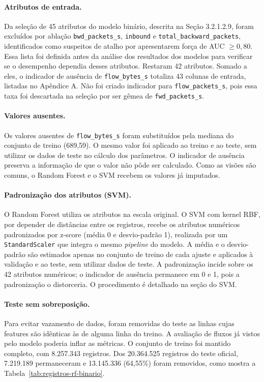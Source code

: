 \documentclass[
    12pt,                %
    openright,           %
    oneside,             %
    a4paper,             %
    english,             %
    brazil               %
]{abntex2}
\begin{document}
\paragraph{Atributos de entrada.}
Da seleção de 45 atributos do modelo binário, descrita na Seção 3.2.1.2.9, foram excluídos por ablação \texttt{bwd\_packets\_s}, \texttt{inbound} e \texttt{total\_backward\_packets}, identificados como suspeitos de atalho por apresentarem força de AUC $\geq 0{,}80$. Essa lista foi definida antes da análise dos resultados dos modelos para verificar se o desempenho dependia desses atributos. Restaram 42 atributos. Somado a eles, o indicador de ausência de \texttt{flow\_bytes\_s} totaliza 43 colunas de entrada, listadas no Apêndice A. Não foi criado indicador para \texttt{flow\_packets\_s}, pois essa taxa foi descartada na seleção por ser gêmea de \texttt{fwd\_packets\_s}.

\paragraph{Valores ausentes.}
Os valores ausentes de \texttt{flow\_bytes\_s} foram substituídos pela mediana do conjunto de treino (689,59). O mesmo valor foi aplicado ao treino e ao teste, sem utilizar os dados de teste no cálculo dos parâmetros. O indicador de ausência preserva a informação de que o valor não pôde ser calculado. Como as visões são comuns, o Random Forest e o SVM recebem os valores já imputados.

\paragraph{Padronização dos atributos (SVM).}
O Random Forest utiliza os atributos na escala original. O SVM com kernel RBF, por depender de distâncias entre os registros, recebe os atributos numéricos padronizados por z-score (média 0 e desvio-padrão 1), realizada por um \texttt{StandardScaler} que integra o mesmo \textit{pipeline} do modelo. A média e o desvio-padrão são estimados apenas no conjunto de treino de cada ajuste e aplicados à validação e ao teste, sem utilizar dados de teste. A padronização incide sobre os 42 atributos numéricos; o indicador de ausência permanece em 0 e 1, pois a padronização o distorceria. O procedimento é detalhado na seção do SVM.

\paragraph{Teste sem sobreposição.}
Para evitar vazamento de dados, foram removidas do teste as linhas cujas features são idênticas às de alguma linha do treino. A avaliação de fluxos já vistos pelo modelo poderia inflar as métricas. O conjunto de treino foi mantido completo, com 8.257.343 registros. Dos 20.364.525 registros do teste oficial, 7.219.189 permaneceram e 13.145.336 (64,55\%) foram removidos, como mostra a Tabela~\ref{tab:registros-rf-binario}.
\end{document}
